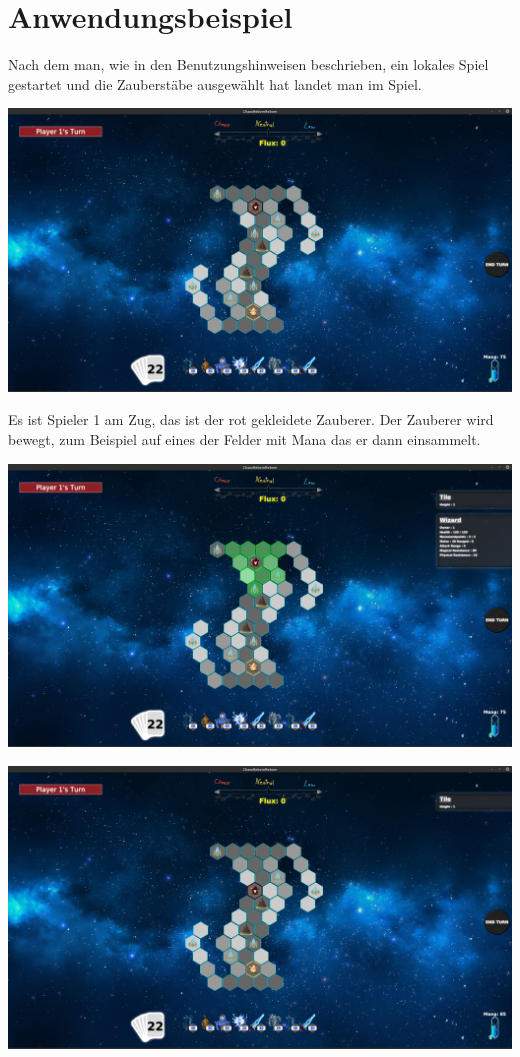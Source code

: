 \documentclass[a4paper,12pt]{scrartcl}
\begin{document}
	\section{Anwendungsbeispiel}
	Nach dem man, wie in den Benutzungshinweisen beschrieben, ein lokales Spiel gestartet und die Zauberstäbe ausgewählt hat landet man im Spiel.\\
\begin{center}\includegraphics[width=\textwidth]{Prog2_EA_V2/screenshots/Anwendung1.png}\end{center}
	Es ist Spieler 1 am Zug, das ist der rot gekleidete Zauberer. Der Zauberer wird bewegt, zum Beispiel auf eines der Felder mit Mana das er dann einsammelt.\\
	\begin{center}\includegraphics[width=\textwidth]{Prog2_EA_V2/screenshots/Anwendung2.png}\end{center}
	\begin{center}\includegraphics[width=\textwidth]{Prog2_EA_V2/screenshots/Anwendung3.png}\end{center}
\end{document}
